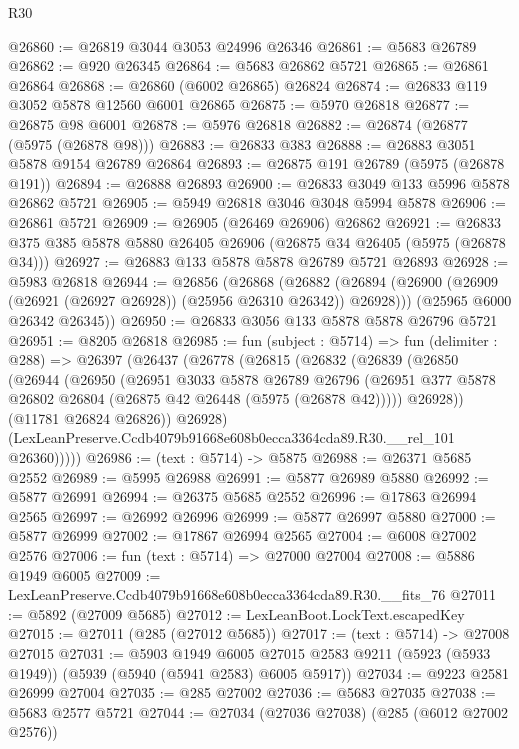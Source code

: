 \begin{lexlean}{R30}
\begin{coremodule}
@26860 := @26819 @3044 @3053 @24996 @26346
@26861 := @5683 @26789
@26862 := @920 @26345
@26864 := @5683 @26862 @5721
@26865 := @26861 @26864
@26868 := @26860 (@6002 @26865) @26824
@26874 := @26833 @119 @3052 @5878 @12560 @6001 @26865
@26875 := @5970 @26818
@26877 := @26875 @98 @6001
@26878 := @5976 @26818
@26882 := @26874 (@26877 (@5975 (@26878 @98)))
@26883 := @26833 @383
@26888 := @26883 @3051 @5878 @9154 @26789 @26864
@26893 := @26875 @191 @26789 (@5975 (@26878 @191))
@26894 := @26888 @26893
@26900 := @26833 @3049 @133 @5996 @5878 @26862 @5721
@26905 := @5949 @26818 @3046 @3048 @5994 @5878
@26906 := @26861 @5721
@26909 := @26905 (@26469 @26906) @26862
@26921 := @26833 @375 @385 @5878 @5880 @26405 @26906 (@26875 @34 @26405 (@5975 (@26878 @34)))
@26927 := @26883 @133 @5878 @5878 @26789 @5721 @26893
@26928 := @5983 @26818
@26944 := @26856
    (@26868
      (@26882 (@26894 (@26900 (@26909 (@26921 (@26927 @26928)) (@25956 @26310 @26342)) @26928)))
      (@25965 @6000 @26342 @26345))
@26950 := @26833 @3056 @133 @5878 @5878 @26796 @5721
@26951 := @8205 @26818
@26985 := fun (subject : @5714) =>
  fun (delimiter : @288) =>
  @26397
    (@26437
      (@26778
        (@26815
          (@26832
            (@26839
              (@26850
                (@26944
                  (@26950
                    (@26951
                      @3033
                      @5878
                      @26789
                      @26796
                      (@26951 @377 @5878 @26802 @26804 (@26875 @42 @26448 (@5975 (@26878 @42)))))
                    @26928))
                (@11781 @26824 @26826))
              @26928)
            (LexLeanPreserve.Ccdb4079b91668e608b0ecca3364cda89.R30.__rel_101 @26360)))))
@26986 := (text : @5714) -> @5875
@26988 := @26371 @5685 @2552
@26989 := @5995 @26988
@26991 := @5877 @26989 @5880
@26992 := @5877 @26991
@26994 := @26375 @5685 @2552
@26996 := @17863 @26994 @2565
@26997 := @26992 @26996
@26999 := @5877 @26997 @5880
@27000 := @5877 @26999
@27002 := @17867 @26994 @2565
@27004 := @6008 @27002 @2576
@27006 := fun (text : @5714) => @27000 @27004
@27008 := @5886 @1949 @6005
@27009 := LexLeanPreserve.Ccdb4079b91668e608b0ecca3364cda89.R30.__fits_76
@27011 := @5892 (@27009 @5685)
@27012 := LexLeanBoot.LockText.escapedKey
@27015 := @27011 (@285 (@27012 @5685))
@27017 := (text : @5714) -> @27008 @27015
@27031 := @5903
    @1949
    @6005
    @27015
    @2583
    @9211
    (@5923 (@5933 @1949))
    (@5939 (@5940 (@5941 @2583) @6005 @5917))
@27034 := @9223 @2581 @26999 @27004
@27035 := @285 @27002
@27036 := @5683 @27035
@27038 := @5683 @2577 @5721
@27044 := @27034 (@27036 @27038) (@285 (@6012 @27002 @2576))

\end{coremodule}
\end{lexlean}
